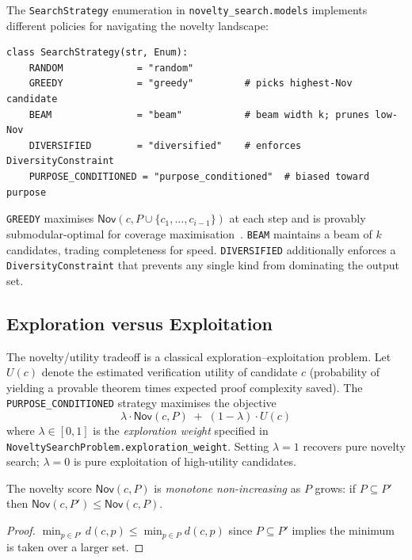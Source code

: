 \documentclass[11pt]{article}
\newcommand{\Nov}{\mathsf{Nov}}            %
\newcommand{\alg}[1]{\texttt{\small #1}}   %
\begin{document}
The \alg{SearchStrategy} enumeration in \texttt{novelty\_search.models}
implements different policies for navigating the novelty landscape:

\begin{lstlisting}[style=jugeo-python, caption={%
  Novelty search strategy enumeration.}]
class SearchStrategy(str, Enum):
    RANDOM             = "random"
    GREEDY             = "greedy"         # picks highest-Nov candidate
    BEAM               = "beam"           # beam width k; prunes low-Nov
    DIVERSIFIED        = "diversified"    # enforces DiversityConstraint
    PURPOSE_CONDITIONED = "purpose_conditioned"  # biased toward purpose
\end{lstlisting}

\alg{GREEDY} maximises $\Nov(c, P \cup \{c_1, \ldots, c_{i-1}\})$
at each step and is provably submodular-optimal for coverage
maximisation~\cite{nemhauser1978analysis}.  \alg{BEAM} maintains a
beam of $k$ candidates, trading completeness for speed.
\alg{DIVERSIFIED} additionally enforces a \texttt{DiversityConstraint}
that prevents any single kind from dominating the output set.

\subsection{Exploration versus Exploitation}

The novelty/utility tradeoff is a classical exploration--exploitation
problem.  Let $U(c)$ denote the estimated verification utility of
candidate $c$ (probability of yielding a provable theorem times
expected proof complexity saved).  The \alg{PURPOSE\_CONDITIONED}
strategy maximises the objective
\[
  \lambda \cdot \Nov(c, P) \;+\; (1 - \lambda) \cdot U(c)
\]
where $\lambda \in [0,1]$ is the \emph{exploration weight} specified in
\texttt{NoveltySearchProblem.exploration\_weight}.  Setting
$\lambda = 1$ recovers pure novelty search; $\lambda = 0$ is pure
exploitation of high-utility candidates.

\begin{proposition}\label{prop:novelty-monotone}
The novelty score $\Nov(c, P)$ is \emph{monotone non-increasing}
as $P$ grows: if $P \subseteq P'$ then $\Nov(c, P') \leq \Nov(c, P)$.
\end{proposition}
\begin{proof}
$\min_{p \in P'} d(c,p) \leq \min_{p \in P} d(c,p)$ since $P \subseteq P'$
implies the minimum is taken over a larger set.
\end{proof}
\end{document}
